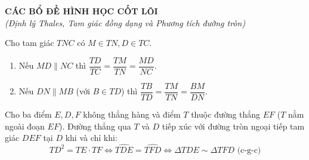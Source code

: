 \documentclass[12pt,a4paper]{article}
\begin{document}
\begin{center}
	{\Large \textbf{CÁC BỔ ĐỀ HÌNH HỌC CỐT LÕI}}\\[2mm]
	{\small \textit{(Định lý Thales, Tam giác đồng dạng và Phương tích đường tròn)}}
\end{center}
\vspace{4mm}

\begin{tcolorbox}[colback=blue!5!white,colframe=blue!75!black,title=\textbf{Bổ đề 1: Định lý Thales và Tam giác đồng dạng với các đường song song}]
Cho tam giác $TNC$ có $M \in TN, D \in TC$. 
\begin{enumerate}
    \item Nếu $MD \parallel NC$ thì $\dfrac{TD}{TC} = \dfrac{TM}{TN} = \dfrac{MD}{NC}$.
    \item Nếu $DN \parallel MB$ (với $B \in TD$) thì $\dfrac{TB}{TD} = \dfrac{TM}{TN} = \dfrac{BM}{DN}$.
\end{enumerate}
\end{tcolorbox}

\vspace{3mm}

\begin{tcolorbox}[colback=teal!5!white,colframe=teal!75!black,title=\textbf{Bổ đề 2: Phương tích và Tiêu chuẩn tiếp xúc của đường tròn}]
Cho ba điểm $E, D, F$ không thẳng hàng và điểm $T$ thuộc đường thẳng $EF$ ($T$ nằm ngoài đoạn $EF$). Đường thẳng qua $T$ và $D$ tiếp xúc với đường tròn ngoại tiếp tam giác $DEF$ tại $D$ khi và chỉ khi:
\[
TD^2 = TE \cdot TF \iff \widehat{TDE} = \widehat{TFD} \iff \Delta TDE \sim \Delta TFD \text{ (c-g-c)}
\]
\end{tcolorbox}
\end{document}

